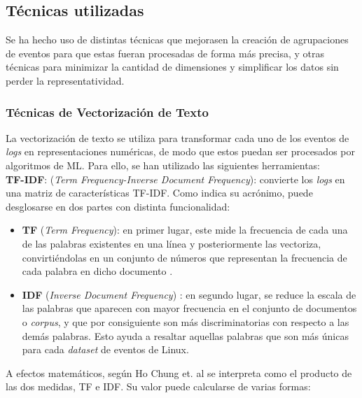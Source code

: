 \subsection{Técnicas utilizadas}

Se ha hecho uso de distintas técnicas que mejorasen la creación de agrupaciones de eventos para que estas fueran procesadas de forma más precisa, y otras técnicas para minimizar la cantidad de dimensiones y simplificar los datos sin perder la representatividad.

\subsubsection*{Técnicas de Vectorización de Texto}

La vectorización de texto se utiliza para transformar cada uno de los eventos de \textit{logs} en representaciones numéricas, de modo que estos puedan ser procesados por algoritmos de \gls{ML}. Para ello, se han utilizado las siguientes herramientas: \\

\textbf{\gls{TF}-\gls{IDF}}: (\textit{Term Frequency-Inverse Document Frequency}): convierte los \textit{logs} en una matriz de características \gls{TF}-\gls{IDF}. Como indica su acrónimo, puede desglosarse en dos partes con distinta funcionalidad:
\begin{itemize}
    \item \textbf{\gls{TF}} (\textit{Term Frequency}): en primer lugar, este mide la frecuencia de cada una de las palabras existentes en una línea y posteriormente las vectoriza, convirtiéndolas en un conjunto de números que representan la frecuencia de cada palabra en dicho documento \footnotemark. \\
    \item \textbf{\gls{IDF}} (\textit{Inverse Document Frequency}) \label{IDF}: en segundo lugar, se reduce la escala de las palabras que aparecen con mayor frecuencia en el conjunto de documentos o \textit{corpus}, y que por consiguiente son más discriminatorias con respecto a las demás palabras. Esto ayuda a resaltar aquellas palabras que son más únicas para cada \textit{dataset} de eventos de Linux. \\
\end{itemize}


A efectos matemáticos, según Ho Chung et. al \cite{tf-idf} se interpreta como el producto de las dos medidas, \gls{TF} e \gls{IDF}. Su valor puede calcularse de varias formas:

